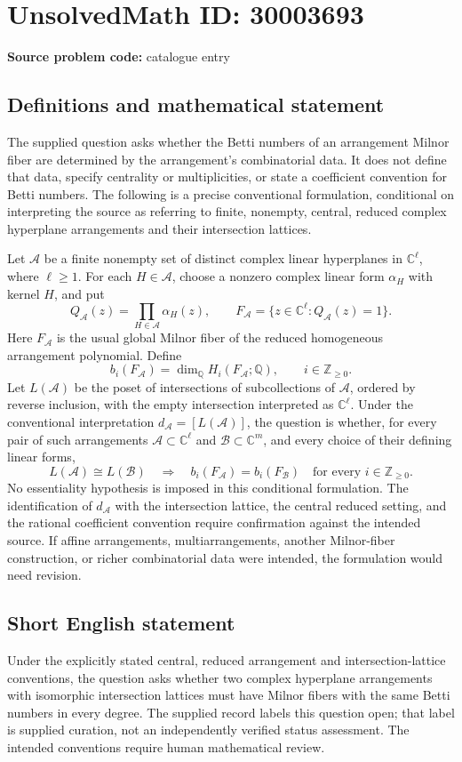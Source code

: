 \documentclass[11pt]{article}
\newcommand{\Z}{\mathbb{Z}}
\newcommand{\Q}{\mathbb{Q}}
\newcommand{\C}{\mathbb{C}}
\begin{document}
\section*{UnsolvedMath ID: 30003693}
\textbf{Source problem code:} catalogue entry
\subsection{Definitions and mathematical statement}
The supplied question asks whether the Betti numbers of an arrangement Milnor fiber are determined by the arrangement's combinatorial data. It does not define that data, specify centrality or multiplicities, or state a coefficient convention for Betti numbers. The following is a precise conventional formulation, conditional on interpreting the source as referring to finite, nonempty, central, reduced complex hyperplane arrangements and their intersection lattices.

Let \(\mathcal A\) be a finite nonempty set of distinct complex linear hyperplanes in \(\C^{\ell}\), where \(\ell\geq 1\). For each \(H\in\mathcal A\), choose a nonzero complex linear form \(\alpha_H\) with kernel \(H\), and put
\[
Q_{\mathcal A}(z)=\prod_{H\in\mathcal A}\alpha_H(z),\qquad
F_{\mathcal A}=\{z\in\C^{\ell}:Q_{\mathcal A}(z)=1\}.
\]
Here \(F_{\mathcal A}\) is the usual global Milnor fiber of the reduced homogeneous arrangement polynomial. Define
\[
b_i(F_{\mathcal A})=\dim_{\Q}H_i(F_{\mathcal A};\Q),\qquad i\in\Z_{\geq 0}.
\]
Let \(L(\mathcal A)\) be the poset of intersections of subcollections of \(\mathcal A\), ordered by reverse inclusion, with the empty intersection interpreted as \(\C^{\ell}\). Under the conventional interpretation \(d_{\mathcal A}=[L(\mathcal A)]\), the question is whether, for every pair of such arrangements \(\mathcal A\subset\C^{\ell}\) and \(\mathcal B\subset\C^{m}\), and every choice of their defining linear forms,
\[
L(\mathcal A)\cong L(\mathcal B)
\quad\Longrightarrow\quad
b_i(F_{\mathcal A})=b_i(F_{\mathcal B})
\quad\text{for every }i\in\Z_{\geq 0}.
\]
No essentiality hypothesis is imposed in this conditional formulation. The identification of \(d_{\mathcal A}\) with the intersection lattice, the central reduced setting, and the rational coefficient convention require confirmation against the intended source. If affine arrangements, multiarrangements, another Milnor-fiber construction, or richer combinatorial data were intended, the formulation would need revision.
\subsection{Short English statement}
Under the explicitly stated central, reduced arrangement and intersection-lattice conventions, the question asks whether two complex hyperplane arrangements with isomorphic intersection lattices must have Milnor fibers with the same Betti numbers in every degree. The supplied record labels this question open; that label is supplied curation, not an independently verified status assessment. The intended conventions require human mathematical review.
\end{document}
